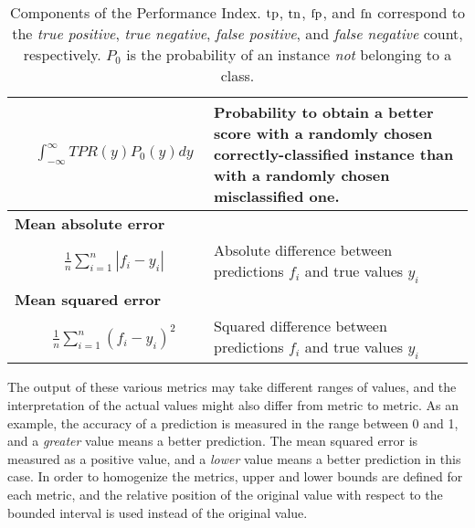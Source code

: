 \begin{table}[!ht]
\begin{tabularx}{\textwidth}{| l c X |}
			& $
				\begin{aligned}
					\int_{-\infty}^{\infty} TPR(y) P_0(y) dy
				\end{aligned}
			$ & Probability to obtain a better score with a randomly chosen correctly-classified
			instance than with a randomly chosen misclassified one.\\
			\hline
			\multicolumn{3}{|l|}{\bf Mean absolute error}\\
			& $
				\begin{aligned}
					\frac 1 n \sum_{i=1}^n |f_i - y_i|
				\end{aligned}
			$ & Absolute difference between predictions $f_i$ and true values $y_i$\\
			\hline
			\multicolumn{3}{|l|}{\bf Mean squared error}\\
			& $
				\begin{aligned}
					\frac 1 n \sum_{i=1}^n (f_i - y_i)^2
				\end{aligned}
			$ & Squared difference between predictions $f_i$ and true values $y_i$\\
			\hline
		\end{tabularx}
		\endgroup
		\caption[Components of the Performance Index]{Components of the Performance Index. $\mathrm{tp}$,
		$\mathrm{tn}$, $\mathrm{fp}$, and $\mathrm{fn}$ correspond to the \emph{true positive}, \emph{true negative},
		\emph{false positive}, and \emph{false negative} count, respectively. $P_0$ is the
		probability of an instance \emph{not} belonging to a class.}
		\label{tb:metrics}
	\end{table}

	The output of these various metrics may take different ranges of values, and the interpretation of the
	actual values might also differ from metric to metric. As an example, the accuracy of a
	prediction is measured in the range between 0 and 1, and a \emph{greater} value means a better
	prediction. The mean squared error is measured as a positive value, and a \emph{lower} value means a
	better prediction in this case. In order to homogenize the metrics, upper and lower bounds are defined for
	each metric, and the relative position of the original value with respect to the bounded
	interval is used instead of the original value.

